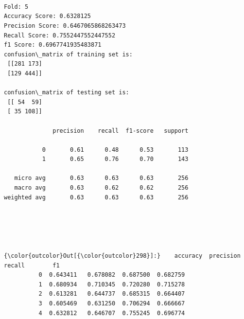 \documentclass[11pt]{article}
\begin{document}
    \begin{center}
    \end{center}
    { \hspace*{\fill} \\}
    
    \begin{center}
    \end{center}
    { \hspace*{\fill} \\}
    
    \begin{Verbatim}[commandchars=\\\{\}]

Fold: 5
Accuracy Score: 0.6328125
Precision Score: 0.6467065868263473
Recall Score: 0.7552447552447552
f1 Score: 0.6967741935483871
confusion\_matrix of training set is: 
 [[281 173]
 [129 444]] 

confusion\_matrix of testing set is: 
 [[ 54  59]
 [ 35 108]] 

              precision    recall  f1-score   support

           0       0.61      0.48      0.53       113
           1       0.65      0.76      0.70       143

   micro avg       0.63      0.63      0.63       256
   macro avg       0.63      0.62      0.62       256
weighted avg       0.63      0.63      0.63       256


    \end{Verbatim}

    \begin{center}
    \end{center}
    { \hspace*{\fill} \\}
    
    \begin{center}
    \end{center}
    { \hspace*{\fill} \\}
    
\begin{Verbatim}[commandchars=\\\{\}]
{\color{outcolor}Out[{\color{outcolor}298}]:}    accuracy  precision    recall        f1
          0  0.643411   0.678082  0.687500  0.682759
          1  0.680934   0.710345  0.720280  0.715278
          2  0.613281   0.644737  0.685315  0.664407
          3  0.605469   0.631250  0.706294  0.666667
          4  0.632812   0.646707  0.755245  0.696774
\end{Verbatim}
            
\end{document}
